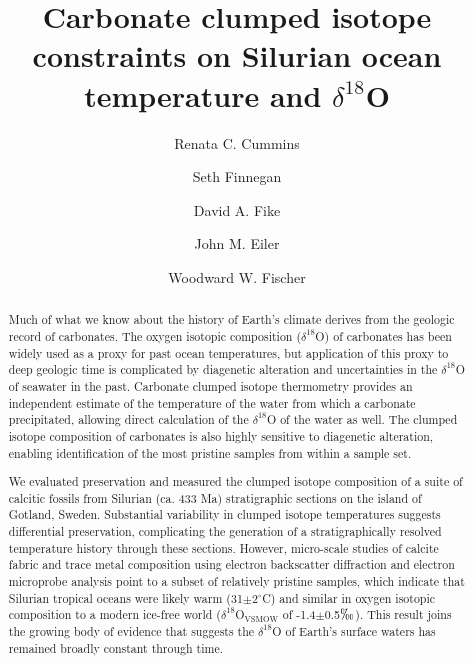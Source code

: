 \documentclass[5p, authoryear]{elsarticle}
\begin{document}
\begin{frontmatter}

\title{Carbonate clumped isotope constraints on Silurian ocean temperature and $\delta^{18}$O}

\author[caltech]{Renata C. Cummins}

\author[berkley]{Seth Finnegan}

\author[washU]{David A. Fike}

\author[caltech]{John M. Eiler}

\author[caltech]{Woodward W. Fischer}


\address[caltech]{California Institute of Technology, Geological and Planetary Sciences, MC 100-23, Pasadena, CA 91125}

\address[berkley]{Department of Integrative Biology, University of California, 1005 Valley Life Sciences Bldg \#3140, Berkeley, CA 94720}

\address[washU]{Department of Earth and Planetary Sciences, Washington University, St. Louis, Missouri 63130}


\begin{abstract}
Much of what we know about the history of Earth's climate derives from the geologic record of carbonates. The oxygen isotopic composition ($\delta^{18}$O) of carbonates has been widely used as a proxy for past ocean temperatures, but application of this proxy to deep geologic time is complicated by diagenetic alteration and uncertainties in the $\delta^{18}$O of seawater in the past. Carbonate clumped isotope thermometry provides an independent estimate of the temperature of the water from which a carbonate precipitated, allowing direct calculation of the $\delta^{18}$O of the water as well. The clumped isotope composition of carbonates is also highly sensitive to diagenetic alteration, enabling identification of the most pristine samples from within a sample set. 

We evaluated preservation and measured the clumped isotope composition of a suite of calcitic fossils from Silurian (ca. 433 Ma) stratigraphic sections on the island of Gotland, Sweden. Substantial variability in clumped isotope temperatures suggests differential preservation, complicating the generation of a stratigraphically resolved temperature history through these sections. However, micro-scale studies of calcite fabric and trace metal composition using electron backscatter diffraction and electron microprobe analysis point to a subset of relatively pristine samples, which indicate that Silurian tropical oceans were likely warm (31$\pm$2$^{\circ}$C) and similar in oxygen isotopic composition to a modern ice-free world ($\delta^{18}$O$_{\text{VSMOW}}$ of -1.4$\pm$0.5$\permil$). This result joins the growing body of evidence that suggests the $\delta^{18}$O of Earth's surface waters has remained broadly constant through time. 
\end{abstract}

\end{frontmatter}
\end{document}
